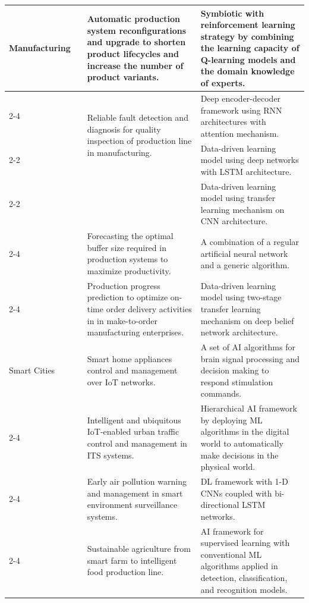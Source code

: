 \documentclass[journal]{IEEEtran}
\begin{document}
\begin{table}[ht!]
\begin{tabular}{|p{2.35cm}|p{0.75cm}|p{5.75cm}|p{7.65cm}|}
Manufacturing
& \cite{doltsinis2018symbiotic}	& Automatic production system reconfigurations and upgrade to shorten product lifecycles and increase the number of product variants.	& Symbiotic with reinforcement learning strategy by  combining the learning capacity of Q-learning models and the domain knowledge of experts.\\ \cline{2-4}
& \cite{lee2021attention}	& \multirow{2}{5.75cm}{Reliable fault detection and diagnosis for quality inspection of production line in manufacturing.}	& Deep encoder-decoder framework using RNN architectures with attention mechanism.\\ \cline{2-2} \cline{4-4}
& \cite{xue2020diagnosis}		& & Data-driven learning model using deep networks with LSTM architecture.\\ \cline{2-2} \cline{4-4}
& \cite{guo2019deep}		& & Data-driven learning model using transfer learning mechanism on CNN architecture.\\ \cline{2-4}
& \cite{alkhalefah2021development}	& Forecasting the optimal buffer size required in production systems to maximize productivity. 	& A combination of a regular artificial neural network and a generic algorithm.\\ \cline{2-4}
& \cite{huang2019twostage}	& Production progress prediction to optimize on-time order delivery activities in in make-to-order manufacturing enterprises.	& Data-driven learning model using two-stage transfer learning mechanism on deep belief network architecture.
\\ \hline\hline

Smart Cities 
& \cite{park2019development}	& Smart home appliances control and management over IoT networks.	& A set of AI algorithms for brain signal processing and decision making to respond stimulation commands.\\ \cline{2-4}
& \cite{zhu2020parallel}	& Intelligent and ubiquitous IoT-enabled urban traffic control and management in ITS systems.	& Hierarchical AI framework by deploying ML algorithms in the digital world to automatically make decisions in the physical world.\\ \cline{2-4}
& \cite{du2021deepair}	& Early air pollution warning and management in smart environment surveillance systems.	& DL framework with 1-D CNNs coupled with bi-directional LSTM networks.\\ \cline{2-4}
& \cite{bhat2021bigdata}	& Sustainable agriculture from smart farm to intelligent food production line.	& AI framework for supervised learning with conventional ML algorithms applied in detection, classification, and recognition models.
\\ \hline\hline


\end{tabular}
\end{table}
\end{document}
